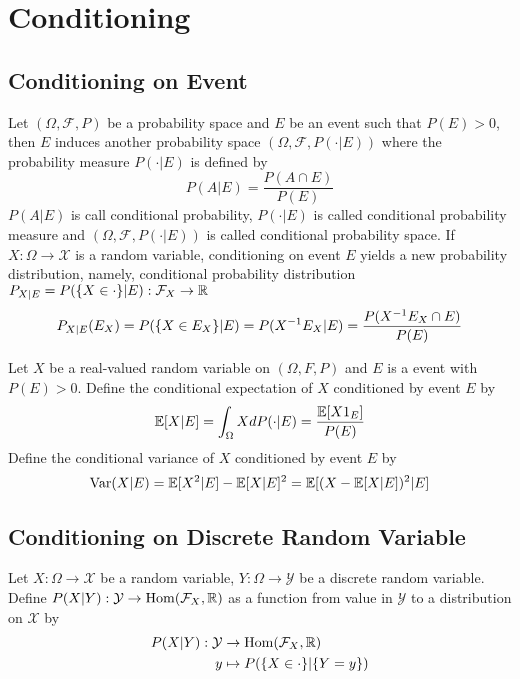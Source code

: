 \documentclass{report}
\begin{document}


\section{Conditioning}

\subsection{Conditioning on Event}

\begin{definition}
    Let $(\Omega, \mathcal{F}, P)$ be a probability space and $E$ be an event such that $P(E) > 0$, then $E$ induces another probability space $(\Omega, \mathcal{F}, P(\cdot | E))$ where the probability measure $P(\cdot | E)$ is defined by
    $$
        P(A | E) = \frac{P(A \cap E)}{P(E)}
    $$
    $P(A | E)$ is call conditional probability, $P(\cdot|E)$ is called conditional probability measure and $(\Omega, \mathcal{F}, P(\cdot | E))$ is called conditional probability space. If $X: \Omega \to \mathcal{X}$ is a random variable, conditioning on event $E$ yields a new probability distribution, namely, conditional probability distribution $P_{X|E} = P(\{X \in \cdot\}|E): \mathcal{F}_X \to \mathbb{R}$
    $$
        P_{X|E}(E_X) = P(\{X \in E_X\} | E) = P(X^{-1} E_X | E) = \frac{P(X^{-1} E_X \cap E)}{P(E)}
    $$ 
\end{definition}

\begin{definition}
    Let $X$ be a real-valued random variable on $(\Omega, F, P)$ and $E$ is a event with $P(E) > 0$. Define the conditional expectation of $X$ conditioned by event $E$ by
    $$
        \mathbb{E}[X|E] = \int_\Omega X d P(\cdot|E) = \frac{\mathbb{E}[X 1_E]}{P(E)}
    $$
    Define the conditional variance of $X$ conditioned by event $E$ by
    $$
        \operatorname{Var}(X|E) = \mathbb{E}[X^2|E] - \mathbb{E}[X|E]^2 = \mathbb{E}[(X - \mathbb{E}[X|E])^2 | E]
    $$
\end{definition}

\subsection{Conditioning on Discrete Random Variable}

\begin{definition}
    Let $X: \Omega \to \mathcal{X}$ be a random variable, $Y: \Omega \to \mathcal{Y}$ be a discrete random variable. Define $P(X|Y): \mathcal{Y} \to \operatorname{Hom}(\mathcal{F}_X, \mathbb{R})$ as a function from value in $\mathcal{Y}$ to a distribution on $\mathcal{X}$ by
    \begin{align*}
    	P(X|Y): \mathcal{Y} &\to \operatorname{Hom}(\mathcal{F}_X, \mathbb{R}) \\
    									y &\mapsto P(\{X \in \cdot\} | \{Y = y\})
    \end{align*} 
\end{definition}
\end{document}
